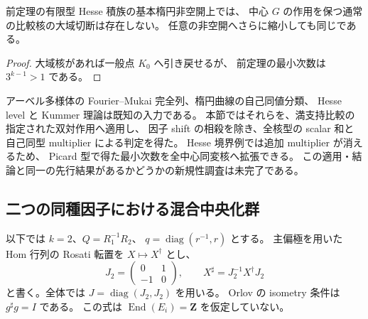 \begin{corollary}[全中心同変核の大域切断の不存在]
\label{mbfc:cor:no-global-kernel}
前定理の有限型 Hesse 積族の基本楕円非空開上では、
中心 $G$ の作用を保つ通常の比較核の大域切断は存在しない。
任意の非空開へさらに縮小しても同じである。
\end{corollary}
\begin{proof}
大域核があれば一般点 $K_0$ へ引き戻せるが、
前定理の最小次数は $3^{k-1}>1$ である。
\end{proof}

\begin{remark}[既知の分類入力と本節の帰結]
\label{mbfc:rem:novelty}
アーベル多様体の Fourier--Mukai 完全列、楕円曲線の自己同値分類、
Hesse level と Kummer 理論は既知の入力である。
本節ではそれらを、満支持比較の指定された双対作用へ適用し、
因子 shift の相殺を除き、全核型の scalar 和と自己同型 multiplier による判定を得た。
Hesse 境界例では追加 multiplier が消えるため、
Picard 型で得た最小次数を全中心同変核へ拡張できる。
この適用・結論と同一の先行結果があるかどうかの新規性調査は未完了である。
\end{remark}

\subsection{二つの同種因子における混合中央化群}

以下では $k=2$、$Q=R_1^{-1}R_2$、
$q=\operatorname{diag}(r^{-1},r)$ とする。
主偏極を用いた Hom 行列の Rosati 転置を $X\mapsto X^\dagger$ とし、
\[
 J_2=\begin{pmatrix}0&1\\-1&0\end{pmatrix},\qquad
 X^\sharp=J_2^{-1}X^\dagger J_2
\]
と書く。全体では $J=\operatorname{diag}(J_2,J_2)$ を用いる。
Orlov の isometry 条件は $g^\sharp g=I$ である。
この式は $\operatorname{End}(E_i)=\mathbf Z$ を仮定していない。

